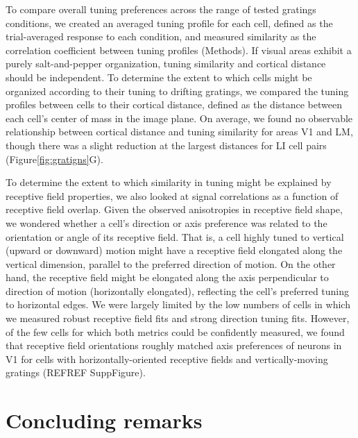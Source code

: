 To compare overall tuning preferences across the range of tested gratings conditions, we created an averaged tuning profile for each cell, defined as the trial-averaged response to each condition, and measured similarity as the correlation coefficient between tuning profiles (Methods). If visual areas exhibit a purely salt-and-pepper organization, tuning similarity and cortical distance should be independent. To determine the extent to which cells might be organized according to their tuning to drifting gratings, we compared the tuning profiles between cells to their cortical distance, defined as the distance between each cell’s center of mass in the image plane. On average, we found no observable relationship between cortical distance and tuning similarity for areas V1 and LM, though there was a slight reduction at the largest distances for LI cell pairs (Figure\ref{fig:gratigns}G). 

To determine the extent to which similarity in tuning might be explained by receptive field properties, we also looked at signal correlations as a function of receptive field overlap. Given the observed anisotropies in receptive field shape, we wondered whether a cell's direction or axis preference was related to the orientation or angle of its receptive field. That is, a cell highly tuned to vertical (upward or downward) motion might have a receptive field elongated along the vertical dimension, parallel to the preferred direction of motion. On the other hand, the receptive field might be elongated along the axis perpendicular to direction of motion (horizontally elongated), reflecting the cell's preferred tuning to horizontal edges. We were largely limited by the low numbers of cells in which we measured robust receptive field fits and strong direction tuning fits. However, of the few cells for which both metrics could be confidently measured, we found that receptive field orientations roughly matched axis preferences of neurons in V1 for cells with horizontally-oriented receptive fields and vertically-moving gratings (REFREF SuppFigure). 


\section{Concluding remarks}


